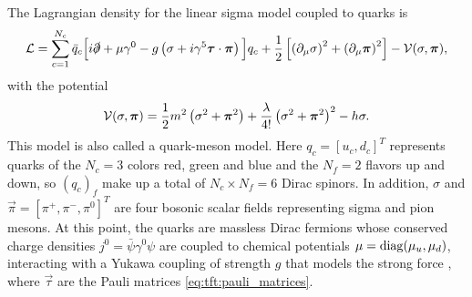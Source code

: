 
The Lagrangian density for the linear sigma model coupled to quarks is
\begin{equation}
	\mathcal{L} = \sum_{c=1}^{N_c} \bar{q}_c \Big[ i \slashed\partial + \mu \gamma^0 - g \left( \sigma + i \gamma^5 {\bm{\tau}} \cdot {\bm{\pi}} \right) \Big] q_c
	      + \frac12 \left[ \left( \partial_\mu \sigma \right)^2 + \left( \partial_\mu {\bm{\pi}} \right)^2 \right] - \mathcal{V}(\sigma,{\bm{\pi}}) ,
\label{eq:lsm:lagrangian}
\end{equation}
with the potential
\begin{equation}
	\mathcal{V}(\sigma,{\bm{\pi}}) = \frac12 m^2 \left( \sigma^2 + {\bm{\pi}}^2 \right) + \frac{\lambda}{4!} \left( \sigma^2 + {\bm{\pi}}^2 \right)^2 - h \sigma .
\label{eq:lsm:potential}
\end{equation}
This model is also called a quark-meson model.
Here $q_c = [u_c, d_c]^T$ represents quarks of the $N_c = 3$ colors red, green and blue and the $N_f = 2$ flavors up and down, so $(q_c)_f$ make up a total of $N_c \times N_f = 6$ Dirac spinors.
In addition, $\sigma$ and $\vec\pi = [\pi^+, \pi^-, \pi^0]^T$ are four bosonic scalar fields representing sigma and pion mesons.
At this point, the quarks are massless Dirac fermions whose conserved charge densities $j^0 = \bar\psi \gamma^0 \psi$ are coupled to chemical potentials $\mu = \operatorname{diag}(\mu_u, \mu_d)$, interacting with a Yukawa coupling of strength $g$ that models the strong force , where $\vec\tau$ are the Pauli matrices \eqref{eq:tft:pauli_matrices}.

